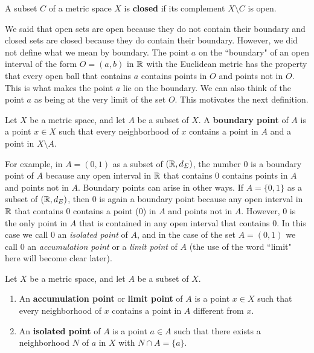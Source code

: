 \begin{definition} \label{def:closed_metric_space} A subset $C$ of a metric space $X$ is \textbf{closed} if its complement $X \setminus C$ is open. 
\end{definition}


We said that open sets are open because they do not contain their boundary and closed sets are closed because they do contain their boundary. However, we did not define what we mean by boundary. The point $a$ on the ``boundary" of an open interval of the form $O=(a,b)$ in $\mathbb{R}$ with the Euclidean metric has the property that every open ball that contains $a$ contains points in $O$ and points not in $O$. This is what makes the point $a$ lie on the boundary. We can also think of the point $a$ as being at the very limit of the set $O$. This motivates the next definition.

\begin{definition} Let $X$ be a metric space, and let $A$ be a subset of $X$. A \textbf{boundary point} of $A$ is a point $x \in X$ such that every neighborhood of $x$ contains a point in $A$ and a point in $X \setminus A$. 
\end{definition}

For example, in $A=(0,1)$ as a subset of $(\mathbb{R}, d_E)$, the number 0 is a boundary point of $A$ because any open interval in $\mathbb{R}$ that contains $0$ contains points in $A$ and points not in $A$. Boundary points can arise in other ways. If $A = \{0,1\}$ as a subset of $(\mathbb{R}, d_E)$, then 0 is again a boundary point because any open interval in $\mathbb{R}$ that contains $0$ contains a point ($0$) in $A$ and points not in $A$. However, $0$ is the only point in $A$ that is contained in any open interval that contains $0$. In this case we call $0$ an \emph{isolated point} of $A$, and in the case of the set $A = (0,1)$ we call $0$ an \emph{accumulation point} or a  \emph{limit point} of $A$ (the use of the word ``limit" here will become clear later). 

\begin{definition} Let $X$ be a metric space, and let $A$ be a subset of $X$. 
\begin{enumerate}
\item An \textbf{accumulation point} or \textbf{limit point} of $A$ is a point $x \in X$ such that every neighborhood of $x$ contains a point in $A$ different from $x$. 
\item  An \textbf{isolated point} of $A$ is a point $a \in A$ such that there exists a neighborhood $N$ of $a$ in $X$ with $N \cap A = \{a\}$.  
\end{enumerate}
\end{definition}

